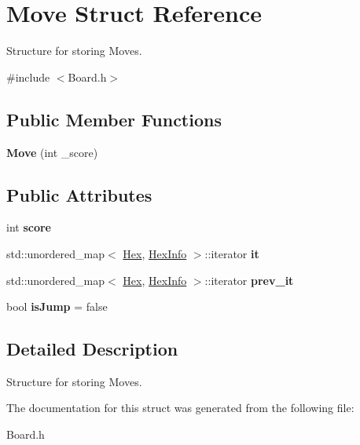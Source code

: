\hypertarget{structMove}{}\section{Move Struct Reference}
\label{structMove}


Structure for storing Moves.  




{\ttfamily \#include $<$Board.\+h$>$}

\subsection*{Public Member Functions}
\begin{DoxyCompactItemize}
\item 
{\bfseries Move} (int \+\_\+score)\hypertarget{structMove_a22dbf6a4cdc5bf0f15eef7b1fcfbae8e}{}\label{structMove_a22dbf6a4cdc5bf0f15eef7b1fcfbae8e}

\end{DoxyCompactItemize}
\subsection*{Public Attributes}
\begin{DoxyCompactItemize}
\item 
int {\bfseries score}\hypertarget{structMove_a5317736c5694bec3a8b7209245dd285c}{}\label{structMove_a5317736c5694bec3a8b7209245dd285c}

\item 
std\+::unordered\+\_\+map$<$ \hyperlink{classHex}{Hex}, \hyperlink{structHexInfo}{Hex\+Info} $>$\+::iterator {\bfseries it}\hypertarget{structMove_aa0b9cdf923e5ad6e2dbb530e022b3bad}{}\label{structMove_aa0b9cdf923e5ad6e2dbb530e022b3bad}

\item 
std\+::unordered\+\_\+map$<$ \hyperlink{classHex}{Hex}, \hyperlink{structHexInfo}{Hex\+Info} $>$\+::iterator {\bfseries prev\+\_\+it}\hypertarget{structMove_a26c6ef8f57d5c09a7d8460e845c03d51}{}\label{structMove_a26c6ef8f57d5c09a7d8460e845c03d51}

\item 
bool {\bfseries is\+Jump} = false\hypertarget{structMove_a31f71f0cf3d843dc596beab63597adbd}{}\label{structMove_a31f71f0cf3d843dc596beab63597adbd}

\end{DoxyCompactItemize}


\subsection{Detailed Description}
Structure for storing Moves. 

The documentation for this struct was generated from the following file\+:\begin{DoxyCompactItemize}
\item 
Board.\+h\end{DoxyCompactItemize}
